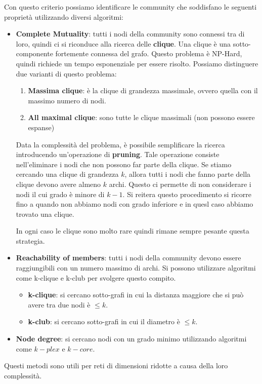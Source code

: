 Con questo criterio possiamo identificare le community che soddisfano le seguenti
proprietà utilizzando diversi algoritmi:
\begin{itemize}
    \item \textbf{Complete Mutuality}: tutti i nodi della community sono connessi
          tra di loro, quindi ci si riconduce alla ricerca delle \textbf{clique}.
          Una clique è una sotto-componente fortemente connessa del grafo.
          Questo problema è NP-Hard, quindi richiede
          un tempo esponenziale per essere risolto. Possiamo distinguere due varianti
          di questo problema:
          \begin{enumerate}
              \item \textbf{Massima clique}: è la clique di grandezza massimale,
                    ovvero quella con il massimo numero di nodi.
              \item \textbf{All maximal clique}: sono tutte le clique massimali (non possono essere espanse)
          \end{enumerate}
          Data la complessità del problema, è possibile semplificare la ricerca
          introducendo un'operazione di \textbf{pruning}. Tale operazione
          consiste nell'eliminare i nodi che non possono far parte della clique.
          Se stiamo cercando una clique di grandezza $k$, allora tutti i nodi che
          fanno parte della clique devono avere almeno $k$ archi. Questo ci permette
          di non considerare i nodi il cui grado è minore di $k - 1$. Si reitera 
          questo procedimento si ricorre fino a quando non abbiamo nodi con grado inferiore 
          e in quesl caso abbiamo trovato una clique.

          In ogni caso le clique sono molto rare quindi rimane sempre pesante
          questa strategia.
    \item \textbf{Reachability of members}: tutti i nodi della community devono
          essere raggiungibili con un numero massimo di archi. Si possono utilizzare
          algoritmi come k-clique e k-club per svolgere questo compito.
          \begin{itemize}
              \item \textbf{k-clique}: si cercano sotto-grafi in cui la distanza
                    maggiore che si può avere tra due nodi è $\leq k$.
              \item \textbf{k-club}: si cercano sotto-grafi in cui il diametro è
                    $\leq k$.
          \end{itemize}
    \item \textbf{Node degree}: si cercano nodi con un grado minimo utilizzando
          algoritmi come $k-plex$ e $k-core$.
\end{itemize}
Questi metodi sono utili per reti di dimensioni ridotte a causa della loro
complessità.
